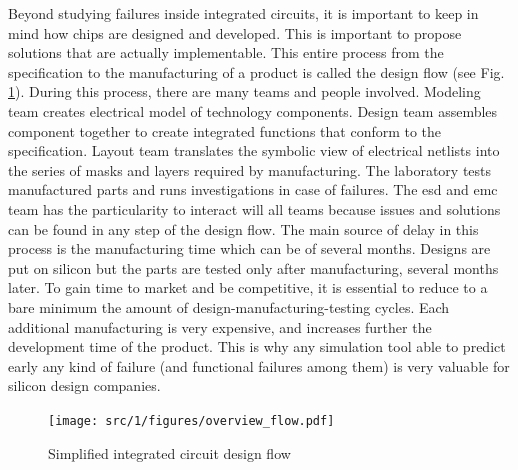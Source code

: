 Beyond studying failures inside integrated circuits, it is important to keep in mind how chips are designed and developed.
This is important to propose solutions that are actually implementable.
This entire process from the specification to the manufacturing of a product is called the design flow (see Fig. \ref{fig:ic-design-flow}).
During this process, there are many teams and people involved.
Modeling team creates electrical model of technology components.
Design team assembles component together to create integrated functions that conform to the specification.
Layout team translates the symbolic view of electrical netlists into the series of masks and layers required by manufacturing.
The laboratory tests manufactured parts and runs investigations in case of failures.
The \gls{esd} and \gls{emc} team has the particularity to interact will all teams because issues and solutions can be found in any step of the design flow.
The main source of delay in this process is the manufacturing time which can be of several months.
Designs are put on silicon but the parts are tested only after manufacturing, several months later.
To gain time to market and be competitive, it is essential to reduce to a bare minimum the amount of design-manufacturing-testing cycles.
Each additional manufacturing is very expensive, and increases further the development time of the product.
This is why any simulation tool able to predict early any kind of failure (and functional failures among them) is very valuable for silicon design companies.

\begin{figure}[!h]
  \centering
  \texttt{[image: src/1/figures/overview\_flow.pdf]}
  \caption{Simplified integrated circuit design flow}
  \label{fig:ic-design-flow}
\end{figure}

